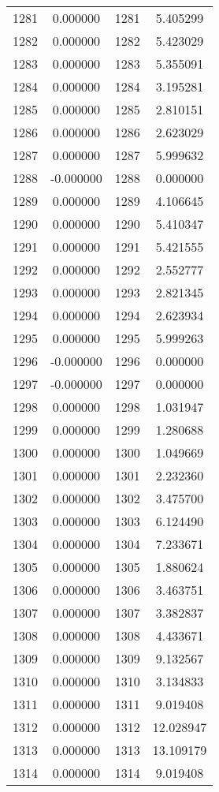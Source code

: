 \documentclass[12pt]{article}
\begin{document}
\begin{longtable}{@{}cccc@{}}
1281 & 0.000000 & 1281 & 5.405299 \\
1282 & 0.000000 & 1282 & 5.423029 \\
1283 & 0.000000 & 1283 & 5.355091 \\
1284 & 0.000000 & 1284 & 3.195281 \\
1285 & 0.000000 & 1285 & 2.810151 \\
1286 & 0.000000 & 1286 & 2.623029 \\
1287 & 0.000000 & 1287 & 5.999632 \\
1288 & -0.000000 & 1288 & 0.000000 \\
1289 & 0.000000 & 1289 & 4.106645 \\
1290 & 0.000000 & 1290 & 5.410347 \\
1291 & 0.000000 & 1291 & 5.421555 \\
1292 & 0.000000 & 1292 & 2.552777 \\
1293 & 0.000000 & 1293 & 2.821345 \\
1294 & 0.000000 & 1294 & 2.623934 \\
1295 & 0.000000 & 1295 & 5.999263 \\
1296 & -0.000000 & 1296 & 0.000000 \\
1297 & -0.000000 & 1297 & 0.000000 \\
1298 & 0.000000 & 1298 & 1.031947 \\
1299 & 0.000000 & 1299 & 1.280688 \\
1300 & 0.000000 & 1300 & 1.049669 \\
1301 & 0.000000 & 1301 & 2.232360 \\
1302 & 0.000000 & 1302 & 3.475700 \\
1303 & 0.000000 & 1303 & 6.124490 \\
1304 & 0.000000 & 1304 & 7.233671 \\
1305 & 0.000000 & 1305 & 1.880624 \\
1306 & 0.000000 & 1306 & 3.463751 \\
1307 & 0.000000 & 1307 & 3.382837 \\
1308 & 0.000000 & 1308 & 4.433671 \\
1309 & 0.000000 & 1309 & 9.132567 \\
1310 & 0.000000 & 1310 & 3.134833 \\
1311 & 0.000000 & 1311 & 9.019408 \\
1312 & 0.000000 & 1312 & 12.028947 \\
1313 & 0.000000 & 1313 & 13.109179 \\
1314 & 0.000000 & 1314 & 9.019408 \\

\end{longtable}
\end{document}
